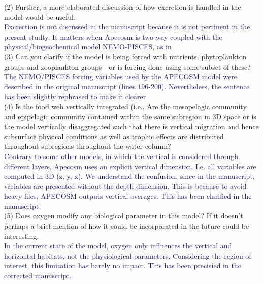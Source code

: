 \documentclass[12pt]{article}
\newcommand{\resp}[1]{\textcolor{MidnightBlue}{#1}}
\begin{document}

(2) Further, a more elaborated discussion of how excretion is handled in the model would be useful. \\ 

\resp{Excrection is not discussed in the manuscript because it is not pertinent in the present studty. It matters 
when Apecosm is two-way coupled with the physical/biogeochemical model NEMO-PISCES, as in \cite{aumontEvaluatingPotentialImpacts2018, lemezoNaturalVariabilityMarine2016, dupontHighTrophicLevel2023}} \\


(3) Can you clarify if the model is being forced with nutrients, phytoplankton groups and zooplankton groups - or is forcing done using some subset of these? \\

\resp{The NEMO/PISCES forcing variables used by the APECOSM model were described in the original manuscript (lines  196-200). Nevertheless, the sentence has been slightly rephrased to make it clearer}\\

(4) Is the food web vertically integrated (i.e., Are the mesopelagic community and epipelagic community contained within the same subregion in 3D space or is the model vertically disaggregated such that there is vertical migration and hence subsurface physical conditions as well as trophic effects are distributed throughout subregions throughout the water column? \\ 

\resp{Contrary to some other models, in which the vertical is considered through different layers, Apecosm uses an explicit vertical dimension. I.e. all variables are computed in 3D (z, y, x). We understand the confusion, since in the manuscript, variables are presented without the depth dimension. This is because to avoid heavy files, APECOSM outputs vertical averages. This has been clarified in the manuscript}\\

(5) Does oxygen modify any biological parameter in this model? If it doesn’t perhaps a brief mention of how it could be incorporated in the future could be interesting. \\ 

\resp{In the current state of the model, oxygen only influences the vertical and horizontal habitats, not the physiological parameters. Considering the region of interest, this limitation has barely no impact. This has been precisied in the corrected manuscript.}\\
\end{document}
